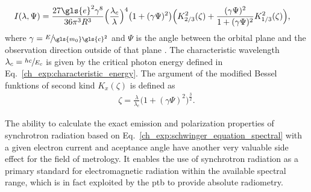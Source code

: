 \begin{align}
  I(\lambda,\Psi) &= \frac{27 \gls{e}^2 \gamma^8 }{36 \pi^3 R^3} \Big(\frac{\lambda_c}{\lambda}\Big)^4 \big(1+ (\gamma \Psi)^2\big)\Big( K_{2/3}^2(\zeta) + \frac{(\gamma \Psi)^2}{1 + (\gamma \Psi)^2} K_{1/3}^2(\zeta)\Big) \text{,}
 \label{ch_exp:schwinger_equation_spectral}
\end{align}
where $\gamma = \sfrac{E}{\gls{m_0} \gls{c}^2}$ and $\Psi$ is the angle between the orbital plane and the observation direction outside of that plane \cite{schwinger_classical_1949}. The characteristic wavelength $\lambda_c = \sfrac{h c}{E_c}$ is given by the critical photon energy defined in Eq.~\eqref{ch_exp:characteristic_energy}. The argument of the modified Bessel funktions of second kind $K_{x}(\zeta)$ is defined as
\begin{align}
 \zeta = \frac{\lambda}{\lambda_c} \big(1 + (\gamma \Psi)^2\big)^\frac{3}{2} \text{.}
\end{align}


The ability to calculate the exact emission and polarization properties of synchrotron radiation based on Eq.~\eqref{ch_exp:schwinger_equation_spectral} with a given electron current and aceptance angle have another very valuable side effect for the field of metrology. It enables the use of synchrotron radiation as a primary standard for electromagnetic radiation within the available spectral range, which is in fact exploited by the \gls{ptb} \cite{thornagel_electron_2001} to provide absolute radiometry.

